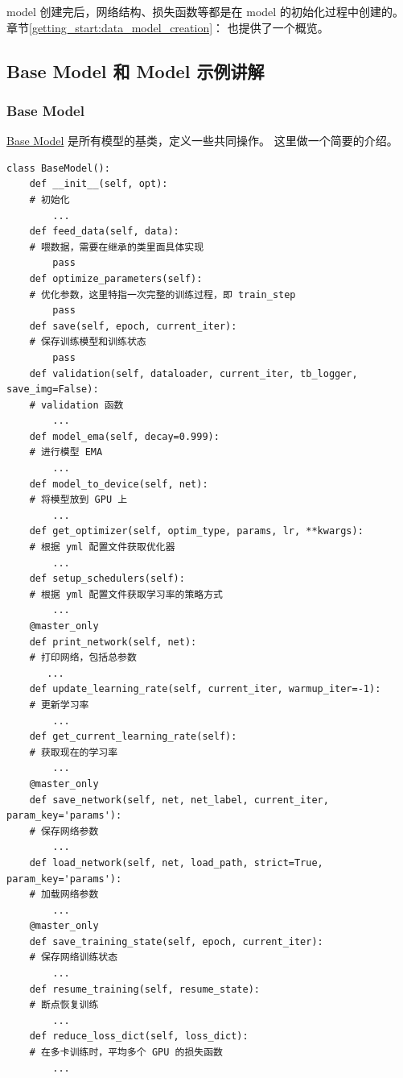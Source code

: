 \documentclass[../main.tex]{subfiles}
\begin{document}
model 创建完后，网络结构、损失函数等都是在 model 的初始化过程中创建的。章节\ref{getting_start:data_model_creation}： 也提供了一个概览。

\subsection{Base Model 和 Model 示例讲解}\label{code_structure:basemodel_example}

\subsubsection{Base Model}\label{code_structure:base_model}
\href{https://github.com/XPixelGroup/BasicSR/blob/master/basicsr/models/base_model.py}{Base Model} 是所有模型的基类，定义一些共同操作。
这里做一个简要的介绍。

\begin{verbatim}
class BaseModel():
    def __init__(self, opt):
    # 初始化
        ...
    def feed_data(self, data):
    # 喂数据，需要在继承的类里面具体实现
        pass
    def optimize_parameters(self):
    # 优化参数，这里特指一次完整的训练过程，即 train_step
        pass
    def save(self, epoch, current_iter):
    # 保存训练模型和训练状态
        pass
    def validation(self, dataloader, current_iter, tb_logger, save_img=False):
    # validation 函数
        ...
    def model_ema(self, decay=0.999):
    # 进行模型 EMA
        ...
    def model_to_device(self, net):
    # 将模型放到 GPU 上
        ...
    def get_optimizer(self, optim_type, params, lr, **kwargs):
    # 根据 yml 配置文件获取优化器
        ...
    def setup_schedulers(self):
    # 根据 yml 配置文件获取学习率的策略方式
        ...
    @master_only
    def print_network(self, net):
    # 打印网络，包括总参数
       ...
    def update_learning_rate(self, current_iter, warmup_iter=-1):
    # 更新学习率
        ...
    def get_current_learning_rate(self):
    # 获取现在的学习率
        ...
    @master_only
    def save_network(self, net, net_label, current_iter, param_key='params'):
    # 保存网络参数
        ...
    def load_network(self, net, load_path, strict=True, param_key='params'):
    # 加载网络参数
        ...
    @master_only
    def save_training_state(self, epoch, current_iter):
    # 保存网络训练状态
        ...
    def resume_training(self, resume_state):
    # 断点恢复训练
        ...
    def reduce_loss_dict(self, loss_dict):
    # 在多卡训练时，平均多个 GPU 的损失函数
        ...
\end{verbatim}
\end{document}
